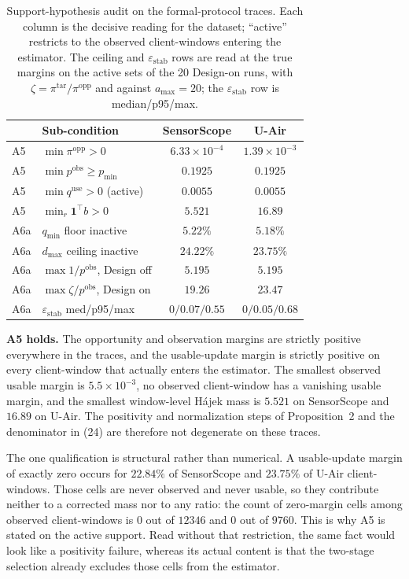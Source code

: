 \begin{table}[!t]
\centering
\caption{Support-hypothesis audit on the formal-protocol traces.  Each column is
the decisive reading for the dataset; ``active'' restricts to the observed
client-windows entering the estimator.  The ceiling and
$\varepsilon_{\mathrm{stab}}$ rows are read at the true margins on the active
sets of the 20 Design-on runs, with
$\zeta=\pi^{\mathrm{tar}}/\pi^{\mathrm{opp}}$ and against $a_{\max}=20$; the
$\varepsilon_{\mathrm{stab}}$ row is median/p95/max.}
\label{tab:app_a5_a6_audit}
\footnotesize
\setlength{\tabcolsep}{3pt}
\begin{tabular*}{\columnwidth}{@{\extracolsep{\fill}}llcc}
\toprule
 & Sub-condition & SensorScope & U-Air\\
\midrule
A5 & $\min \pi^{\mathrm{opp}}>0$ & $6.33\times10^{-4}$ & $1.39\times10^{-3}$\\
A5 & $\min p^{\mathrm{obs}}\ge p_{\min}$ & $0.1925$ & $0.1925$\\
A5 & $\min q^{\mathrm{use}}>0$ (active) & $0.0055$ & $0.0055$\\
A5 & $\min_r \mathbf{1}^{\top}b>0$ & $5.521$ & $16.89$\\
\midrule
A6a & $q_{\min}$ floor inactive & $5.22\%$ & $5.18\%$\\
A6a & $d_{\max}$ ceiling inactive & $24.22\%$ & $23.75\%$\\
A6a & $\max 1/p^{\mathrm{obs}}$, Design off & $5.195$ & $5.195$\\
A6a & $\max \zeta/p^{\mathrm{obs}}$, Design on & $19.26$ & $\mathbf{23.47}$\\
\midrule
A6a & $\varepsilon_{\mathrm{stab}}$ med/p95/max & $0/0.07/0.55$ & $0/0.05/0.68$\\
\bottomrule
\end{tabular*}
\end{table}

\noindent\textbf{A5 holds.}  The opportunity and observation margins are
strictly positive everywhere in the traces, and the usable-update margin is
strictly positive on every client-window that actually enters the estimator.
The smallest observed usable margin is $5.5\times10^{-3}$, no observed
client-window has a vanishing usable margin, and the smallest window-level
H\'ajek mass is $5.521$ on SensorScope and $16.89$ on U-Air.  The positivity
and normalization steps of Proposition~2 and the denominator in
(24) are therefore not degenerate on these traces.

The one qualification is structural rather than numerical.  A usable-update
margin of exactly zero occurs for $22.84\%$ of SensorScope and $23.75\%$ of
U-Air client-windows.  Those cells are never observed and never usable, so
they contribute neither to a corrected mass nor to any ratio: the count of
zero-margin cells among observed client-windows is $0$ out of $12346$ and $0$
out of $9760$.  This is why A5 is stated on the active support.  Read without
that restriction, the same fact would look like a positivity failure, whereas
its actual content is that the two-stage selection already excludes those
cells from the estimator.

